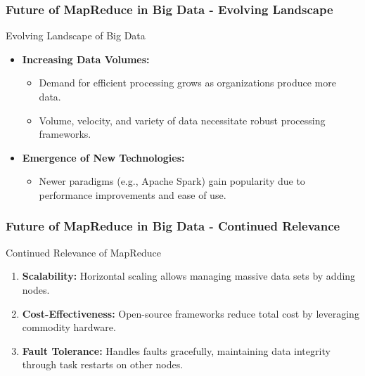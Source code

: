 \documentclass[aspectratio=169]{beamer}
\begin{document}
\begin{frame}[fragile]
    \frametitle{Future of MapReduce in Big Data - Evolving Landscape}
    \begin{block}{Evolving Landscape of Big Data}
        \begin{itemize}
            \item \textbf{Increasing Data Volumes:}
            \begin{itemize}
                \item Demand for efficient processing grows as organizations produce more data.
                \item Volume, velocity, and variety of data necessitate robust processing frameworks.
            \end{itemize}
            \item \textbf{Emergence of New Technologies:}
            \begin{itemize}
                \item Newer paradigms (e.g., Apache Spark) gain popularity due to performance improvements and ease of use.
            \end{itemize}
        \end{itemize}
    \end{block}
\end{frame}

\begin{frame}[fragile]
    \frametitle{Future of MapReduce in Big Data - Continued Relevance}
    \begin{block}{Continued Relevance of MapReduce}
        \begin{enumerate}
            \item \textbf{Scalability:} Horizontal scaling allows managing massive data sets by adding nodes.
            \item \textbf{Cost-Effectiveness:} Open-source frameworks reduce total cost by leveraging commodity hardware.
            \item \textbf{Fault Tolerance:} Handles faults gracefully, maintaining data integrity through task restarts on other nodes.
        \end{enumerate}
    \end{block}
\end{frame}
\end{document}

